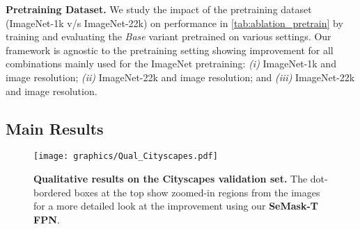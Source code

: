 \documentclass[10pt,twocolumn,letterpaper]{article}
\newcommand{\vspaceundertab}{\vspace{-.2cm}}
\begin{document}
\textbf{Pretraining Dataset.} We study the impact of the pretraining dataset (ImageNet-1k {v/s} ImageNet-22k) on performance in \cref{tab:ablation_pretrain} by training and evaluating the \textit{Base} variant pretrained on various settings. Our framework is agnostic to the pretraining setting showing improvement for all combinations mainly used for the ImageNet pretraining: \textit{(i)} ImageNet-1k and  image resolution; \textit{(ii)} ImageNet-22k and  image resolution; and \textit{(iii)} ImageNet-22k and  image resolution.

\begin{table}
  \centering
  \fontsize{10}{12}\selectfont
  \vspaceundertab
  \caption{\textbf{Ablation on Pretraining dataset.} 
       We compare the improvement when using the SeMask-Base variant with different pretraining settings: \textit{ImageNet-1k}  \textit{ImageNet-22k} and    and show that it is agnostic to the pretraining setting.}
    \label{tab:ablation_pretrain}
\end{table}

\subsection{Main Results}



\begin{figure*}[ht!]
\centering
\texttt{[image: graphics/Qual\_Cityscapes.pdf]}
\caption{
   \textbf{Qualitative results on the Cityscapes validation set.} The dot-bordered boxes at the top show zoomed-in regions from the images for a more detailed look at the improvement using our \textbf{SeMask-T FPN}.}
  \label{fig:qual_cityscapes}
\end{figure*}
\end{document}
